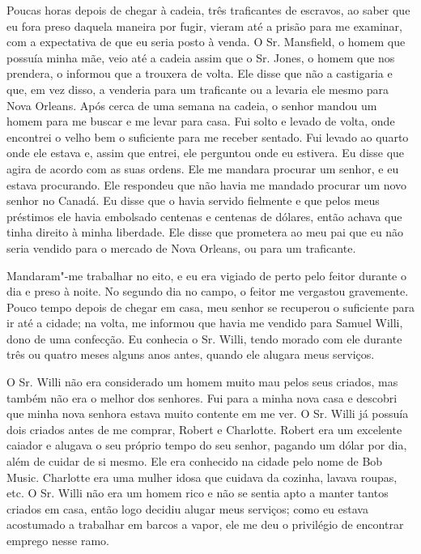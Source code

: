 Poucas horas depois de chegar à cadeia, três traficantes de escravos, ao
saber que eu fora preso daquela maneira por fugir, vieram até a prisão
para me examinar, com a expectativa de que eu seria posto à venda. O Sr.
Mansfield, o homem que possuía minha mãe, veio até a cadeia assim que o
Sr. Jones, o homem que nos prendera, o informou que a trouxera de volta.
Ele disse que não a castigaria e que, em vez disso, a venderia para um
traficante ou a levaria ele mesmo para Nova Orleans. Após cerca de uma
semana na cadeia, o senhor mandou um homem para me buscar e me levar
para casa. Fui solto e levado de volta, onde encontrei o velho bem o
suficiente para me receber sentado. Fui levado ao quarto onde ele estava
e, assim que entrei, ele perguntou onde eu estivera. Eu disse que agira
de acordo com as suas ordens. Ele me mandara procurar um senhor, e eu
estava procurando. Ele respondeu que não havia me mandado procurar um
novo senhor no Canadá. Eu disse que o havia servido fielmente e que
pelos meus préstimos ele havia embolsado centenas e centenas de dólares,
então achava que tinha direito à minha liberdade. Ele disse que
prometera ao meu pai que eu não seria vendido para o mercado de Nova
Orleans, ou para um traficante.

Mandaram"-me trabalhar no eito, e eu era vigiado de perto pelo feitor
durante o dia e preso à noite. No segundo dia no campo, o feitor me
vergastou gravemente. Pouco tempo depois de chegar em casa, meu senhor
se recuperou o suficiente para ir até a cidade; na volta, me informou
que havia me vendido para Samuel Willi, dono de uma confecção. Eu
conhecia o Sr. Willi, tendo morado com ele durante três ou quatro meses
alguns anos antes, quando ele alugara meus serviços.

O Sr. Willi não era considerado um homem muito mau pelos seus criados,
mas também não era o melhor dos senhores. Fui para a minha nova casa e
descobri que minha nova senhora estava muito contente em me ver. O Sr.
Willi já possuía dois criados antes de me comprar, Robert e Charlotte.
Robert era um excelente caiador e alugava o seu próprio tempo do seu
senhor, pagando um dólar por dia, além de cuidar de si mesmo. Ele era
conhecido na cidade pelo nome de Bob Music. Charlotte era uma mulher
idosa que cuidava da cozinha, lavava roupas, etc. O Sr. Willi não era um
homem rico e não se sentia apto a manter tantos criados em casa, então
logo decidiu alugar meus serviços; como eu estava acostumado a trabalhar
em barcos a vapor, ele me deu o privilégio de encontrar emprego nesse
ramo.

